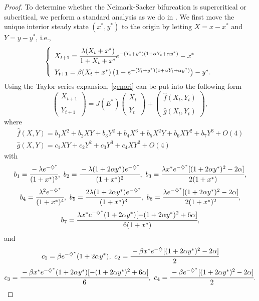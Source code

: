 \documentclass[11pt]{article}
\begin{document}
\begin{proof}
To determine whether the Neimark-Sacker bifurcation is
supercritical or subcritical, we  perform a standard analysis as
we do in \cite{chow2016}. We first move the unique interior steady
state $(x^*, y^*)$ to the origin by letting $X=x-x^*$ and
$Y=y-y^*$, i.e.,
\begin{equation}\label{genori}\left\{\begin{array}{ll}
X_{t+1}= \cfrac{\lambda(X_t+x^*)}{1+X_t+x^*}\displaystyle e^{-(Y_t+y^*)(1+\alpha Y_t+\alpha y^*)}-x^*\\[2.5ex]
Y_{t+1}=\beta(X_t+x^*)\left(1-e^{-(Y_t+y^*)(1+\alpha Y_t+\alpha
y^*)}\right)-y^*.
\end{array}\right.
\end{equation}
Using the Taylor series expansion,  \eqref{genori} can be put
 into the following form
\begin{equation}\label{newNS}\left(\begin{array}{l}
 X_{t+1} \\
 \\
 Y_{t+1}
\end{array}\right)=J(E^*)
\left(\begin{array}{l}
 X_{t} \\
 \\
 Y_{t}
 \end{array}\right)+\left(\begin{array}{l}
 \hat{f}(X_t,Y_t) \\
 \\
 \hat{g}(X_t,Y_t)
 \end{array}\right),\end{equation}
where
\begin{equation}\begin{array}{l}
\hat{f}(X,Y)=b_1X^2+b_2XY+b_3Y^2+b_4X^3+b_5X^2Y+b_6XY^2+b_7Y^3+O(4)\\[1ex]
\hat{g}(X,Y)=c_1XY+c_2Y^2+c_3Y^3+c_4XY^2+O(4)
 \end{array}\end{equation}
with $$b_1=\cfrac{-\lambda e^{-\diamondsuit^*}}{(1+x^*)^3}, \
b_2=\cfrac{-\lambda (1+2\alpha
y^*)e^{-\diamondsuit^*}}{(1+x^*)^2}, \ b_3=\cfrac{\lambda
x^*e^{-\diamondsuit^*}[(1+2\alpha y^*)^2-2\alpha]}{2(1+x^*)},$$
$$ b_4=\cfrac{\lambda ^2e^{-\diamondsuit^*}}{(1+x^*)^4}, \
b_5=\cfrac{2\lambda (1+2\alpha
y^*)e^{-\diamondsuit^*}}{(1+x^*)^3}, \ b_6=\cfrac{\lambda
e^{-\diamondsuit^*}[(1+2\alpha y^*)^2-2\alpha]}{2(1+x^*)^2},$$
$$b_7=\cfrac{\lambda
x^*e^{-\diamondsuit^*}(1+2\alpha y^*)[-(1+2\alpha
y^*)^2+6\alpha]}{6(1+x^*)},$$ and
$$c_1=\beta e^{-\diamondsuit^*}(1+2\alpha y^*), \ c_2=\cfrac{-\beta
x^*e^{-\diamondsuit}[(1+2\alpha y^*)^2-2\alpha]}{2}$$
$$c_3=\cfrac{-\beta x^*e^{-\diamondsuit^*}(1+2\alpha
y^*)[-(1+2\alpha y^*)^2+6\alpha]}{6}, \ c_4=\cfrac{-\beta
e^{-\diamondsuit^*}[(1+2\alpha y^*)^2-2\alpha]}{2}.$$


\end{proof}
\end{document}
